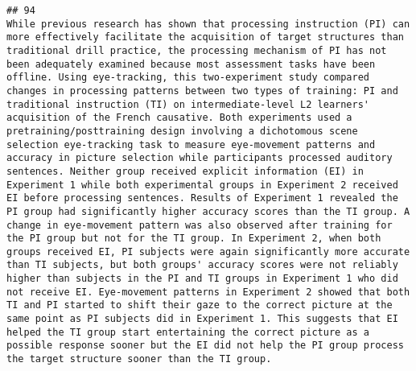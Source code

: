 \documentclass[
  english,
  man]{apa6}
\begin{document}
\begin{verbatim}
## 94                                                                                                                                                                                                                                                                                                                                                                                                                                                                                                                                                                                                                                                                                                                                                                                                                                                                         While previous research has shown that processing instruction (PI) can more effectively facilitate the acquisition of target structures than traditional drill practice, the processing mechanism of PI has not been adequately examined because most assessment tasks have been offline. Using eye-tracking, this two-experiment study compared changes in processing patterns between two types of training: PI and traditional instruction (TI) on intermediate-level L2 learners' acquisition of the French causative. Both experiments used a pretraining/posttraining design involving a dichotomous scene selection eye-tracking task to measure eye-movement patterns and accuracy in picture selection while participants processed auditory sentences. Neither group received explicit information (EI) in Experiment 1 while both experimental groups in Experiment 2 received EI before processing sentences. Results of Experiment 1 revealed the PI group had significantly higher accuracy scores than the TI group. A change in eye-movement pattern was also observed after training for the PI group but not for the TI group. In Experiment 2, when both groups received EI, PI subjects were again significantly more accurate than TI subjects, but both groups' accuracy scores were not reliably higher than subjects in the PI and TI groups in Experiment 1 who did not receive EI. Eye-movement patterns in Experiment 2 showed that both TI and PI started to shift their gaze to the correct picture at the same point as PI subjects did in Experiment 1. This suggests that EI helped the TI group start entertaining the correct picture as a possible response sooner but the EI did not help the PI group process the target structure sooner than the TI group.

\end{verbatim}
\end{document}
